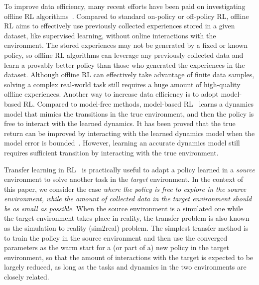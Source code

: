\documentclass[letterpaper]{article} %
\begin{document}
To improve data efficiency, many recent efforts have been paid on investigating offline RL algorithms~\citep{rosete2023latent,zhan2022offline, lyu2022mildly,siegel2020keep,fujimoto2019off}. Compared to standard on-policy or off-policy RL, offline RL aims to effectively use previously collected experiences stored in a given dataset, like supervised learning, without online interactions with the environment. The stored experiences may not be generated by a fixed or known policy, so offline RL algorithms can leverage any previously collected data and learn a provably better policy than those who generated the experiences in the dataset. 
Although offline RL can effectively take advantage of finite data samples, solving a complex real-world task still requires a huge amount of high-quality offline experiences. Another way to increase data efficiency is to adopt model-based RL. Compared to model-free methods, model-based RL~\citep{bakker2001reinforcement,schaefer2007recurrent,kaiser2019model,janner2019trust,delecki2023model} learns a dynamics model that mimics the transitions in the true environment, and then the policy is free to interact with the learned dynamics. It has been proved that the true return can be improved by interacting with the learned dynamics model when the model error is bounded~\citep{janner2019trust}. However, learning an accurate dynamics model still requires sufficient transition by interacting with the true environment.

Transfer learning in RL~\citep{taylor2009transfer,zhu2023transfer} is practically useful to adapt a policy learned in a \emph{source} environment to solve another task in the \emph{target} environment. In the context of this paper, we consider the case \emph{where the policy is free to explore in the source environment, while the amount of collected data in the target environment should be as small as possible}. When the source environment is a simulated one while the target environment takes place in reality, the transfer problem is also known as the simulation to reality (sim2real) problem. The simplest transfer method is to train the policy in the source environment and then use the converged parameters as the warm start for a (or part of a) new policy in the target environment, so that the amount of interactions with the target is expected to be largely reduced, as long as the tasks and dynamics in the two environments are closely related. 
\end{document}
